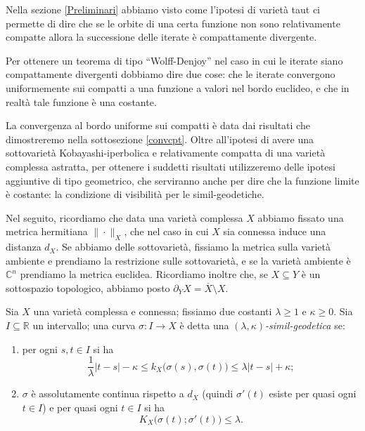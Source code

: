 Nella sezione \ref{Preliminari} abbiamo visto come l'ipotesi di varietà taut ci permette di dire che se le orbite di una certa funzione non sono relativamente compatte allora la successione delle iterate è compattamente divergente.

Per ottenere un teorema di tipo ``Wolff-Denjoy'' nel caso in cui le iterate siano compattamente divergenti dobbiamo dire due cose: che le iterate convergono uniformemente sui compatti a una funzione a valori nel bordo euclideo, e che in realtà tale funzione è una costante.

La convergenza al bordo uniforme sui compatti è data dai risultati che dimostreremo nella sottosezione \ref{convcpt}. Oltre all'ipotesi di avere una sottovarietà Kobayashi-iperbolica e relativamente compatta di una varietà complessa astratta, per ottenere i suddetti risultati utilizzeremo delle ipotesi aggiuntive di tipo geometrico, che serviranno anche per dire che la funzione limite è costante: la condizione di visibilità per le simil-geodetiche.

Nel seguito, ricordiamo che data una varietà complessa $X$ abbiamo fissato una metrica hermitiana $\|\cdot\|_X$, che nel caso in cui $X$ sia connessa induce una distanza $d_X$. Se abbiamo delle sottovarietà, fissiamo la metrica sulla varietà ambiente e prendiamo la restrizione sulle sottovarietà, e se la varietà ambiente è $\mathbb{C}^n$ prendiamo la metrica euclidea. Ricordiamo inoltre che, se $X\subseteq Y$ è un sottospazio topologico, abbiamo posto $\partial_YX=\overline{X}\setminus X$.

\begin{defn}
    Sia $X$ una varietà complessa e connessa; fissiamo due costanti $\lambda \ge 1$ e $\kappa \ge 0$. Sia $I\subseteq \mathbb{R}$ un intervallo; una curva $\sigma:I \longrightarrow X$ è detta una \textit{$(\lambda,\kappa)$-simil-geodetica} se:
    \begin{enumerate}
        \item per ogni $s,t \in I$ si ha
        \begin{equation} \label{simil-geo1}
            \frac{1}{\lambda}|t-s|-\kappa \le k_X\big(\sigma(s),\sigma(t)\big)\le\lambda|t-s|+\kappa;
        \end{equation}
        \item $\sigma$ è assolutamente continua rispetto a $d_X$ (quindi $\sigma'(t)$ esiste per quasi ogni $t \in I$) e per quasi ogni $t \in I$ si ha
        \begin{equation} \label{simil-geo2}
            K_X\big(\sigma(t);\sigma'(t)\big) \le \lambda.
        \end{equation}
    \end{enumerate}
\end{defn}

